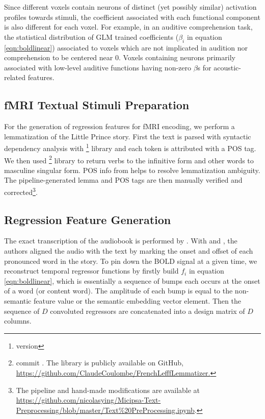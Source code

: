 Since different voxels contain neurons of distinct (yet possibly similar) activation profiles towards stimuli, the coefficient associated with each functional component is also different for each voxel. For example, in an auditive comprehension task, the statistical distribution of GLM trained coefficients (\(\beta_{i}\) in equation \ref{eqn:boldlinear}) associated to voxels which are not implicated in audition nor comprehension to be centered near 0. Voxels containing neurons primarily associated with low-level auditive functions having non-zero \(\beta\)s for acoustic-related features.

\subsection{fMRI Textual Stimuli Preparation} 

For the generation of regression features for fMRI encoding, we perform a lemmatization of the Little Prince story. First the text is parsed with syntactic dependency analysis with \footnote{version } library and each token is attributed with a POS tag. We then used \footnote{commit . The library is publicly available on GitHub, \url{https://github.com/ClaudeCoulombe/FrenchLefffLemmatizer.}}\parencite{sagotLefffFreelyAvailable2010} library to return verbs to the infinitive form and other words to masculine singular form. POS info from  helps to resolve lemmatization ambiguity. The pipeline-generated lemma and POS tags are then manually verified and corrected\footnote{The pipeline and hand-made modifications are available at \url{https://github.com/nicolasying/Micipsa-Text-Preprocessing/blob/master/Text\%20PreProcessing.ipynb}.}.

\subsection{Regression Feature Generation}
\label{subsec:regressionfeaturegeneration}
The exact transcription of the audiobook is performed by \textcite{todorovicAnalysesIRMfLors2018}. With  and , the authors aligned the audio with the text by marking the onset and offset of each pronounced word in the story. To pin down the BOLD signal at a given time, we reconstruct temporal regressor functions by firstly build \(f_{i}\) in equation \ref{eqn:boldlinear}, which is essentially a sequence of bumps each occurs at the onset of a word (or content word). The amplitude of each bump is equal to the non-semantic feature value or the semantic embedding vector element. Then the sequence of \(D\) convoluted  regressors are concatenated into a design matrix of \(D\) columns.

